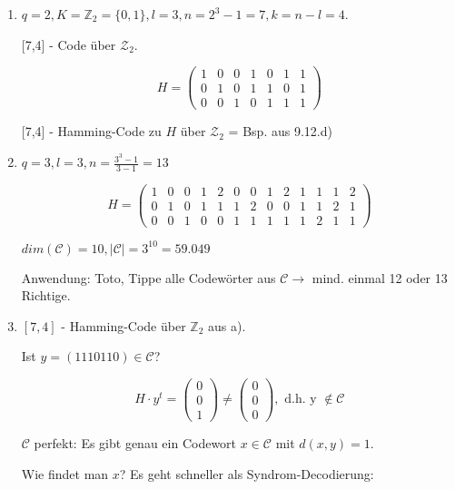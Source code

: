 \documentclass[a4paper, openany]{book}
\begin{document}
\begin{enumerate}[label=(\alph*)]
	\item $q = 2, K = \mathbb{Z}_2 = \{0,1 \}, l =3, n = 2^3 -1 = 7, k = n-l = 4$.

	[7,4] - Code über $\mathcal{Z}_2$.

	\[ H = \begin{pmatrix}1 & 0 & 0 & 1 & 0 & 1 & 1\\ 0 & 1 & 0 & 1 & 1 & 0 & 1 \\ 0 & 0 & 1 & 0 & 1 & 1 & 1 \end{pmatrix} \]

	[7,4] - Hamming-Code zu $H$ über $\mathcal{Z}_2$ = Bsp. aus 9.12.d)

	\item $q = 3, l =3, n = \frac{3^3 -1}{3-1} = 13$

	\[ H = \begin{pmatrix}1 & 0 & 0 & 1 & 2 & 0 & 0 & 1 & 2 & 1 & 1 & 1 & 2 \\ 0 & 1 & 0 & 1 & 1 & 1 & 2 & 0 & 0 & 1 & 1 & 2 & 1 \\ 0 & 0 & 1 & 0 & 0 & 1 & 1 & 1 & 1 & 1 & 2 & 1 & 1 \end{pmatrix} \]

	$dim(\mathcal{C}) = 10, |\mathcal{C}| = 3^{10} = 59.049$

	\par \medskip

	Anwendung: Toto, Tippe alle Codewörter aus $\mathcal{C} \rightarrow$ mind. einmal 12 oder 13 Richtige.


	\item $[7,4]$ - Hamming-Code über $\mathbb{Z}_2$ aus a).

	Ist $y = (1110110) \in \mathcal{C}$?

	\[ H \cdot y^t = \begin{pmatrix} 0 \\ 0 \\1 \end{pmatrix} \neq \begin{pmatrix}0 \\0 \\ 0 \end{pmatrix}, \text{ d.h. y $\not \in \mathcal{C}$} \]

	$\mathcal{C}$ perfekt: Es gibt genau ein Codewort $x \in \mathcal{C}$ mit $d(x,y) = 1$.

	Wie findet man $x$? Es geht schneller als Syndrom-Decodierung:

	\par \medskip


\end{enumerate}
\end{document}
